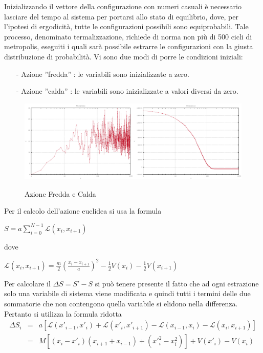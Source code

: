 \documentclass[a4paper,11pt]{report}
\begin{document}
Inizializzando il vettore della configurazione con numeri casuali è necessario lasciare del tempo al sistema per portarsi allo stato di equilibrio, dove, per l'ipotesi di ergodicità, tutte le configurazioni possibili sono equiprobabili. Tale processo, denominato termalizzazione, richiede di norma non più di 500 cicli di metropolis, eseguiti i quali sarà possibile estrarre le configurazioni con la giusta distribuzione di probabilità. Vi sono due modi di porre le condizioni iniziali:
\begin{itemize}
   \small
   \item[-] Azione ''fredda'' : le variabili sono inizializzate a zero.
   \item[-] Azione ''calda'' : le variabili sono inizializzate a valori diversi da zero.
\end{itemize}
\begin{figure}[h]
\centering
\includegraphics[width=0.5\textwidth]{action1}\includegraphics[width=0.5\textwidth]{action2}
\caption{Azione Fredda e Calda}
\label{fig:action}
\end{figure}
Per il calcolo dell'azione euclidea si usa la formula
\begin{center}$S = a\displaystyle\sum\limits_{i=0}^{N-1} \mathcal{L}(x_{i},x_{i+1})$\end{center}
dove
\begin{center}$\mathcal{L}(x_{i},x_{i+1}) = \frac{m}{2}\left(\frac{x_{i}-x_{i+1}}{a}\right)^{2}-\frac{1}{2}V(x_{i})-\frac{1}{2}V(x_{i+1})$\end{center}
Per calcolare il $\Delta S = S'-S$ si può tenere presente il fatto che ad ogni estrazione solo una variabile di sistema viene modificata e quindi tutti i termini delle due sommatorie che non contengono quella variabile si elidono nella differenza. Pertanto si utilizza la formula ridotta
\begin{eqnarray*}
 \Delta S_i &=& a[\mathcal{L}(x'_{i-1},x'_{i})+\mathcal{L}(x'_{i},x'_{i+1})-\mathcal{L}(x_{i-1},x_{i})-\mathcal{L}(x_{i},x_{i+1})]\\
   &=& M[(x_{i}-x'_{i})(x_{i+1}+x_{i-1})+(x'^2_i-x^2_i)]+V(x'_i)-V(x_i)
\end{eqnarray*}
\end{document}
